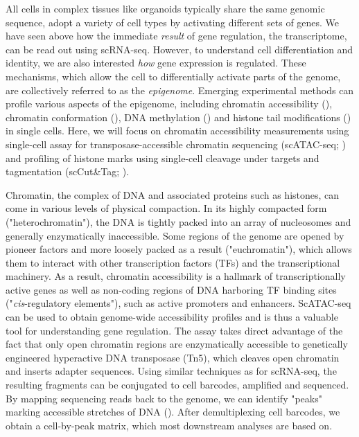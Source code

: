All cells in complex tissues like organoids typically share the same genomic sequence, adopt a variety of cell types by activating different sets of genes. We have seen above how the immediate \textit{result} of gene regulation, the transcriptome, can be read out using scRNA-seq. However, to understand cell differentiation and identity, we are also interested \textit{how} gene expression is regulated. These mechanisms, which allow the cell to differentially activate parts of the genome, are collectively referred to as the \textit{epigenome}. Emerging experimental methods can profile various aspects of the epigenome, including chromatin accessibility (\cite{buenrostro_single-cell_2015,cusanovich_multiplex_2015}), chromatin conformation (\cite{ramani_massively_2017,stevens_3d_2017}), DNA methylation (\cite{smallwood_single-cell_2014}) and histone tail modifications (\cite{kaya-okur_cuttag_2019,bartosovic_single-cell_2021,ku_single-cell_2019,hainer_profiling_2019}) in single cells. Here, we will focus on chromatin accessibility measurements using single-cell assay for transposase-accessible chromatin sequencing (scATAC-seq; \cite{buenrostro_single-cell_2015}) and profiling of histone marks using single-cell cleavage under targets and tagmentation (scCut\&Tag; \cite{kaya-okur_cuttag_2019}).

Chromatin, the complex of DNA and associated proteins such as histones, can come in various levels of physical compaction. In its highly compacted form ("heterochromatin"), the DNA is tightly packed into an array of nucleosomes and generally enzymatically inaccessible. Some regions of the genome are opened by pioneer factors and more loosely packed as a result ("euchromatin"), which allows them to interact with other transcription factors (TFs) and the transcriptional machinery. As a result, chromatin accessibility is a hallmark of transcriptionally active genes as well as non-coding regions of DNA harboring TF binding sites ("\textit{cis}-regulatory elements"), such as active promoters and enhancers. ScATAC-seq can be used to obtain genome-wide accessibility profiles and is thus a valuable tool for understanding gene regulation. The assay takes direct advantage of the fact that only open chromatin regions are enzymatically accessible to genetically engineered hyperactive DNA transposase (Tn5), which cleaves open chromatin and inserts adapter sequences. Using similar techniques as for scRNA-seq, the resulting fragments can be conjugated to cell barcodes, amplified and sequenced. By mapping sequencing reads back to the genome, we can identify "peaks" marking accessible stretches of DNA (\cite{zhang_model-based_2008}). After demultiplexing cell barcodes, we obtain a cell-by-peak matrix, which most downstream analyses are based on.

